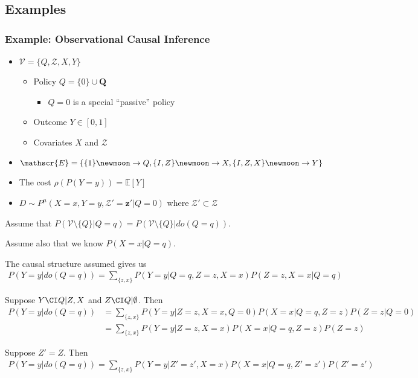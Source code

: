 \subsection{Examples}

\subsubsection{Example: Observational Causal Inference}

\begin{itemize}
    \item $\mathcal{V}=\{Q,\mathcal{Z},X,Y\}$
    \begin{itemize}
        \item Policy $Q=\{0\}\cup \mathbf{Q}$
        \begin{itemize}
            \item $Q=0$ is a special ``passive'' policy
        \end{itemize}
        \item Outcome $Y\in[0,1]$
        \item Covariates $X$ and $\mathcal{Z}$
    \end{itemize}
    \item $\mathscr{E}=\{\{1\}\newmoon \to Q, \{I,Z\}\newmoon \to X,\{I,Z,X\}\newmoon\to Y\}$
    \item The cost $\rho(P(Y=y)) = \mathbb{E}[Y]$
    \item $D\sim P^\mu(X=x,Y=y,\mathcal{Z}'=\mathbf{z}'|Q=0)$ where $\mathcal{Z}'\subset \mathcal{Z}$
\end{itemize}

Assume that $P(\mathcal{V}\setminus\{Q\}|Q=q)=P(\mathcal{V}\setminus\{Q\}|do(Q=q))$.

Assume also that we know $P(X=x|Q=q)$.

The causal structure assumed gives us 
\begin{align}
    P(Y=y|do(Q=q)) = \sum_{\{z,x\}} P(Y=y|Q=q,Z=z,X=x) P(Z=z,X=x|Q=q)
\end{align}

Suppose $Y\CI Q|Z,X$ and $Z\CI Q|\emptyset$. Then
\begin{align}
    P(Y=y|do(Q=q)) &= \sum_{\{z,x\}}P(Y=y|Z=z,X=x,Q=0) P(X=x|Q=q,Z=z) P(Z=z|Q=0)\\
                  &= \sum_{\{z,x\}}P(Y=y|Z=z,X=x) P(X=x|Q=q,Z=z) P(Z=z)
\end{align}

Suppose $Z'=Z$. Then 
\begin{align}
    P(Y=y|do(Q=q)) = \sum_{\{z,x\}}P(Y=y|Z'=z',X=x) P(X=x|Q=q,Z'=z') P(Z'=z')
\end{align}

